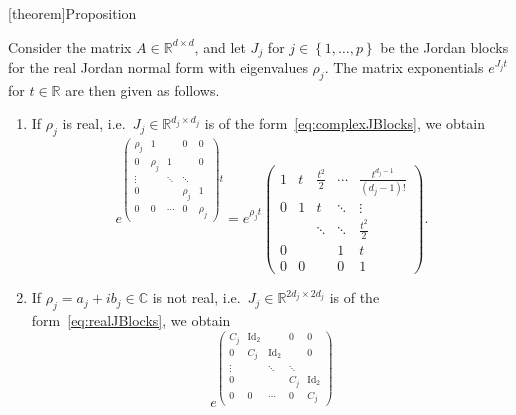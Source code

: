\documentclass[12pt]{report}
\theoremstyle{definition}
\begin{document}
[theorem]{Proposition}
\begin{matrix exponential form}
    Consider the matrix $A\in\mathbb{R}^{d\times d}$, and let $J_j$ for
    $j\in\left\{1,\ldots,p\right\}$ be the Jordan blocks for the real Jordan
    normal form with eigenvalues $\rho_j$. The matrix exponentials $e^{J_jt}$
    for $t\in\mathbb{R}$ are then given as follows.
    \begin{enumerate}[label = (\roman*)]
        \item If $\rho_j$ is real, i.e.\ $J_j\in\mathbb{R}^{d_j\times d_j}$
            is of the form~\ref{eq:complexJBlocks}, we obtain
            \[
                e^{\begin{pmatrix}
                    \rho_j & 1 &   & 0 & 0 \\
                    0 & \rho_j & 1 &   & 0 \\
                    \vdots &   & \ddots & \ddots &  \\
                    0 &   &   & \rho_j & 1 \\
                    0 & 0 & \cdots & 0 & \rho_j
                \end{pmatrix}t}
                = e^{\rho_jt} 
                \begin{pmatrix}
                    1 & t & \frac{t^{2}}{2} & \cdots & \frac{t^{d_j-1}}{(d_j-1)!} \\
                    0 & 1 & t & \ddots & \vdots \\
                      &   & \ddots & \ddots & \frac{t^{2}}{2} \\
                    0 &   &   & 1 & t \\
                    0 & 0 &   & 0 & 1
                \end{pmatrix}.
            \]
        \item If $\rho_j=a_j+ib_j\in\mathbb{C}$ is not real,
            i.e.\ $J_j\in\mathbb{R}^{2d_j\times 2d_j}$ is of the
            form~\ref{eq:realJBlocks}, we obtain
            \[
                e^{\begin{pmatrix}
                    C_j & \text{Id}_2 &   & 0 & 0 \\
                    0 & C_j & \text{Id}_2 &   & 0 \\
                    \vdots &   & \ddots & \ddots &  \\
                    0 &   &   & C_j & \text{Id}_2 \\
                    0 & 0 & \cdots & 0 & C_j

\end{pmatrix}}\]
\end{enumerate}
\end{matrix exponential form}
\end{document}
